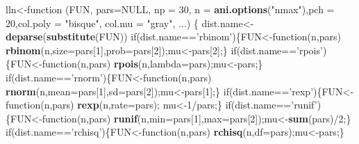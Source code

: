 \documentclass[]{article}
\newenvironment{Shaded}{\begin{snugshade}}{\end{snugshade}}
\newcommand{\KeywordTok}[1]{\textcolor[rgb]{0.13,0.29,0.53}{\textbf{{#1}}}}
\newcommand{\DataTypeTok}[1]{\textcolor[rgb]{0.13,0.29,0.53}{{#1}}}
\newcommand{\DecValTok}[1]{\textcolor[rgb]{0.00,0.00,0.81}{{#1}}}
\newcommand{\StringTok}[1]{\textcolor[rgb]{0.31,0.60,0.02}{{#1}}}
\newcommand{\OtherTok}[1]{\textcolor[rgb]{0.56,0.35,0.01}{{#1}}}
\newcommand{\NormalTok}[1]{{#1}}
\begin{document}
\begin{Shaded}
\begin{Highlighting}[]
\NormalTok{lln<-function (FUN, }\DataTypeTok{pars=}\OtherTok{NULL}\NormalTok{, }\DataTypeTok{np =} \DecValTok{30}\NormalTok{, }\DataTypeTok{n =} \KeywordTok{ani.options}\NormalTok{(}\StringTok{"nmax"}\NormalTok{),}\DataTypeTok{pch =} \DecValTok{20}\NormalTok{,}\DataTypeTok{col.poly =} \StringTok{"bisque"}\NormalTok{, }\DataTypeTok{col.mu =} \StringTok{"gray"}\NormalTok{, ...) }
\NormalTok{\{    dist.name<-}\KeywordTok{deparse}\NormalTok{(}\KeywordTok{substitute}\NormalTok{(FUN))}
     \NormalTok{if(dist.name==}\StringTok{'rbinom'}\NormalTok{)\{FUN<-function(n,pars) }\KeywordTok{rbinom}\NormalTok{(n,}\DataTypeTok{size=}\NormalTok{pars[}\DecValTok{1}\NormalTok{],}\DataTypeTok{prob=}\NormalTok{pars[}\DecValTok{2}\NormalTok{]);mu<-pars[}\DecValTok{2}\NormalTok{];\}}
     \NormalTok{if(dist.name==}\StringTok{'rpois'}\NormalTok{)\{FUN<-function(n,pars) }\KeywordTok{rpois}\NormalTok{(n,}\DataTypeTok{lambda=}\NormalTok{pars);mu<-pars;\}}
     \NormalTok{if(dist.name==}\StringTok{'rnorm'}\NormalTok{)\{FUN<-function(n,pars) }\KeywordTok{rnorm}\NormalTok{(n,}\DataTypeTok{mean=}\NormalTok{pars[}\DecValTok{1}\NormalTok{],}\DataTypeTok{sd=}\NormalTok{pars[}\DecValTok{2}\NormalTok{]);mu<-pars[}\DecValTok{1}\NormalTok{];\}}
     \NormalTok{if(dist.name==}\StringTok{'rexp'}\NormalTok{)\{FUN<-function(n,pars) }\KeywordTok{rexp}\NormalTok{(n,}\DataTypeTok{rate=}\NormalTok{pars); mu<-}\DecValTok{1}\NormalTok{/pars;\}}
     \NormalTok{if(dist.name==}\StringTok{'runif'}\NormalTok{)\{FUN<-function(n,pars) }\KeywordTok{runif}\NormalTok{(n,}\DataTypeTok{min=}\NormalTok{pars[}\DecValTok{1}\NormalTok{],}\DataTypeTok{max=}\NormalTok{pars[}\DecValTok{2}\NormalTok{]);mu<-}\KeywordTok{sum}\NormalTok{(pars)/}\DecValTok{2}\NormalTok{;\}}
     \NormalTok{if(dist.name==}\StringTok{'rchisq'}\NormalTok{)\{FUN<-function(n,pars) }\KeywordTok{rchisq}\NormalTok{(n,}\DataTypeTok{df=}\NormalTok{pars);mu<-pars;\}}
    

\end{Highlighting}
\end{Shaded}
\end{document}
